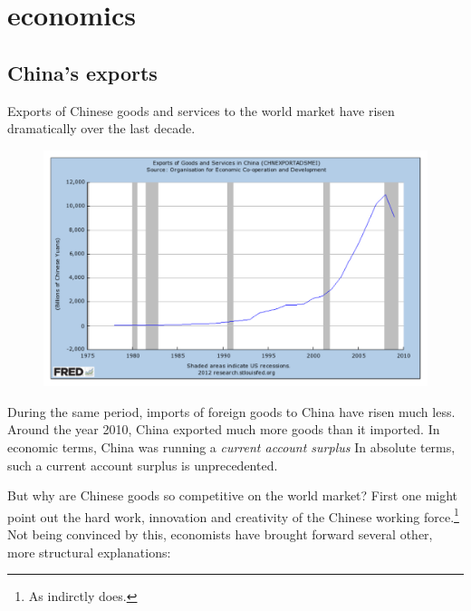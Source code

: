 \documentclass[11pt]{article}
\begin{document}
\setlength{\parindent}{0pt}
\section{economics}

\subsection{China's exports}

Exports of Chinese goods and services to the world market have risen dramatically over the last decade. %
   
     \begin{figure}[h]
     \begin{center}
     \includegraphics[width=1\textwidth]{ExportsChinaFRED.pdf}
     \end{center}
     \end{figure}

During the same period, imports of foreign goods to China have risen much less. Around the year 2010, China exported much more goods than it imported. In economic terms, China was running a \emph{current account surplus} In absolute terms, such a current account surplus  is unprecedented. %

But why are Chinese goods so competitive on the world market? First one might point out the hard work, innovation and creativity of the Chinese working force.\footnote{As \cite[p. 18]{Yu2010} indirctly does.} Not being convinced by this, economists have brought forward several other, more structural explanations:
\end{document}
